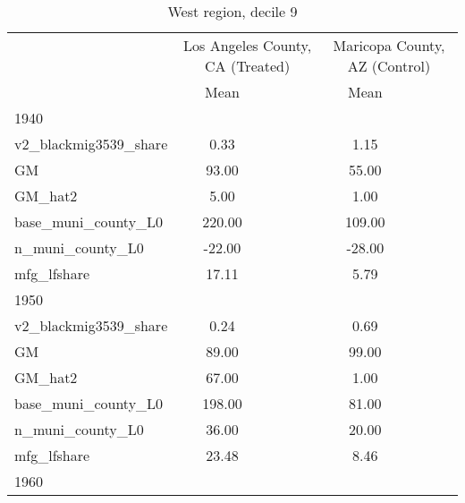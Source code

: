 \begin{table}[htbp]\centering
\def\sym#1{\ifmmode^{#1}\else\(^{#1}\)\fi}
\caption{West region, decile 9 \label{tab1}}
\begin{tabular}{l*{2}{ccc}}
\toprule
                    &\multicolumn{3}{c}{Los Angeles County, CA (Treated)}&\multicolumn{3}{c}{Maricopa County, AZ (Control)}\\
                    &        Mean&            &            &        Mean&            &            \\
\midrule
1940                &            &            &            &            &            &            \\
v2\_blackmig3539\_share&        0.33&            &            &        1.15&            &            \\
GM                  &       93.00&            &            &       55.00&            &            \\
GM\_hat2             &        5.00&            &            &        1.00&            &            \\
base\_muni\_county\_L0 &      220.00&            &            &      109.00&            &            \\
n\_muni\_county\_L0    &      -22.00&            &            &      -28.00&            &            \\
mfg\_lfshare         &       17.11&            &            &        5.79&            &            \\
\midrule
1950                &            &            &            &            &            &            \\
v2\_blackmig3539\_share&        0.24&            &            &        0.69&            &            \\
GM                  &       89.00&            &            &       99.00&            &            \\
GM\_hat2             &       67.00&            &            &        1.00&            &            \\
base\_muni\_county\_L0 &      198.00&            &            &       81.00&            &            \\
n\_muni\_county\_L0    &       36.00&            &            &       20.00&            &            \\
mfg\_lfshare         &       23.48&            &            &        8.46&            &            \\
\midrule
1960                &            &            &            &            &            &            \\

\end{tabular}
\end{table}
